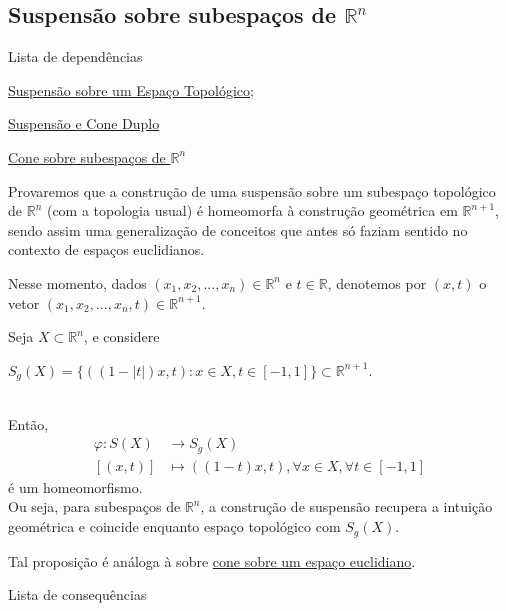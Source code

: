 \subsection{Suspensão sobre subespaços de $\mathbb{R}^n$}
\label{suspensao-euclidiano-prop}
\begin{titlemize}{Lista de dependências}
	\item \hyperref[suspensao-def]{Suspensão sobre um Espaço Topológico};
    \item \hyperref[suspensao-cone-duplo-prop]{Suspensão e Cone Duplo}
    \item \hyperref[cone-euclidiano-prop]{Cone sobre subespaços de $\mathbb{R}^n$}
\end{titlemize}
Provaremos que a construção de uma suspensão sobre um subespaço topológico de $\mathbb{R}^n$ (com a topologia usual) é homeomorfa à construção geométrica em $\mathbb{R}^{n+1}$, sendo assim uma generalização de conceitos que antes só faziam sentido no contexto de espaços euclidianos.

Nesse momento, dados $(x_1,x_2,...,x_n) \in \mathbb{R}^n$ e $t \in \mathbb{R}$, denotemos por $(x,t)$ o vetor $(x_1,x_2,...,x_n,t) \in \mathbb{R}^{n+1}$.

\begin{prop}
	Seja $X \subset \mathbb{R}^n$, e considere\\
    \centerline{$S_g(X) = \{((1-|t|)x,t):x\in X, t\in [-1,1]\} \subset \mathbb{R}^{n+1}$.}\\
    Então,\begin{align*}
        \varphi: S(X) &\rightarrow S_g(X)\\
        [(x,t)] &\mapsto ((1-t)x,t), \forall x\in X, \forall t \in [-1,1]
    \end{align*}
    é um homeomorfismo.\\
    Ou seja, para subespaços de $\mathbb{R}^n$, a construção de suspensão recupera a intuição geométrica e coincide enquanto espaço topológico com $S_g(X)$.
\end{prop}

Tal proposição é análoga à sobre \hyperref[cone-euclidiano-prop]{cone sobre um espaço euclidiano}.

\begin{titlemize}{Lista de consequências}
	\item \hyperref[]{}
\end{titlemize}

